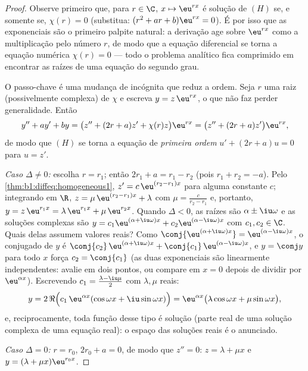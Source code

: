 \begin{proof}
Observe primeiro que, para $r \in \C$, $x \mapsto \eu^{rx}$ é solução de $(H)$
se, e somente se, $\chi(r) = 0$ (substitua: $(r^2 + ar + b)\eu^{rx} =
0$). É por isso que as exponenciais são o primeiro palpite natural:
a derivação age sobre $\eu^{rx}$ como a multiplicação pelo número
$r$, de modo que a equação diferencial se torna a equação numérica
$\chi(r) = 0$ --- todo o problema analítico fica comprimido em
encontrar as raízes de uma equação do segundo grau.

O passo-chave é uma mudança de incógnita que reduz a ordem. Seja $r$
uma raiz (possivelmente complexa) de $\chi$ e escreva $y = z\, \eu^{rx}$,
o que não faz perder generalidade. Então
\[
y'' + ay' + by
= \bigl(z'' + (2r + a) z' + \chi(r) z\bigr)\eu^{rx}
= \bigl(z'' + (2r + a) z'\bigr)\eu^{rx},
\]
de modo que $(H)$ se torna a equação de \emph{primeira ordem} $u' + (2r + a) u = 0$
para $u = z'$.

\emph{Caso $\Delta \neq 0$:} escolha $r = r_1$; então $2r_1 + a = r_1 -
r_2$ (pois $r_1 + r_2 = -a$). Pelo
\cref{thm:b1:diffeq:homogeneous1}, $z' = c\,\eu^{(r_2 - r_1)x}$ para
alguma constante $c$; integrando em $\R$, $z = \mu\, \eu^{(r_2 - r_1)x}
+ \lambda$ com $\mu = \frac{c}{r_2 - r_1}$ e, portanto, $y = z\,
\eu^{r_1 x} = \lambda\,\eu^{r_1x} + \mu\,\eu^{r_2x}$.
Quando $\Delta < 0$, as raízes são $\alpha \pm \iu\omega$ e as
soluções complexas são $y = c_1\eu^{(\alpha+\iu\omega)x} +
c_2\eu^{(\alpha-\iu\omega)x}$ com $c_1, c_2 \in \C$. Quais delas assumem valores reais? Como $\conj{\eu^{(\alpha+\iu\omega)x}} =
\eu^{(\alpha-\iu\omega)x}$, o conjugado de $y$ é $\conj{c_2}\,
\eu^{(\alpha+\iu\omega)x} + \conj{c_1}\,\eu^{(\alpha-\iu\omega)x}$,
e $y = \conj y$ para todo $x$ força $c_2 = \conj{c_1}$ (as duas
exponenciais são linearmente independentes: avalie em dois pontos, ou
compare em $x=0$ depois de dividir por $\eu^{\alpha x}$). Escrevendo $c_1
= \frac{\lambda - \iu\mu}2$ com $\lambda, \mu$ reais:
\[
y = 2\,\Re\Bigl(c_1\,\eu^{\alpha x}(\cos\omega x +
\iu\sin\omega x)\Bigr)
= \eu^{\alpha x}\bigl(\lambda\cos\omega x + \mu\sin\omega
x\bigr),
\]
e, reciprocamente, toda função desse tipo é solução (parte real de uma
solução complexa de uma equação real): o espaço das soluções reais é
o anunciado.

\emph{Caso $\Delta = 0$:} $r = r_0$, $2r_0 + a = 0$, de modo que $z'' = 0$:
$z = \lambda + \mu x$ e $y = (\lambda + \mu x)\eu^{r_0 x}$.
\end{proof}

